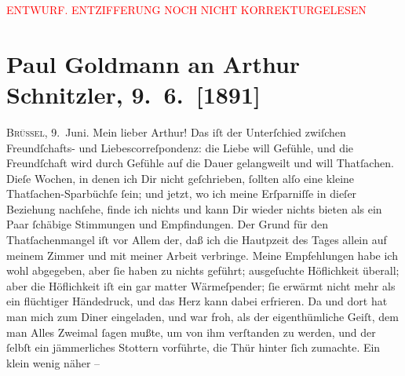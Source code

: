 
\begin{center}
            \textcolor{red}{ENTWURF. ENTZIFFERUNG NOCH NICHT KORREKTURGELESEN}
                      \end{center}
            
               \section[Paul Goldmann an Arthur Schnitzler, 9. 6. {[}1891{]}]{ Paul Goldmann an Arthur Schnitzler, 9. 6. {[}1891{]}}\nopagebreak{}\rehead{ }\begin{ledgroupsized}[t]{13cm}\normalsize\beginnumbering{} \toendnotes[C]{\smallbreak\pagebreak[2]} 
\toendnotes[C]{\smallbreak}\pstart
           \raggedleft{}{\pb}\textsc{Brüssel}, 9. Juni.\pend
           \pstart\center{}Mein lieber Arthur!\pend\pstart
           Das iſt der Unterſchied zwiſchen Freundſchafts- und Liebescorreſpondenz: die Liebe
               will Gefühle, und die Freundſchaft wird durch Gefühle auf die Dauer gelangweilt und
               will Thatſachen. Dieſe Wochen, in denen ich Dir nicht geſchrieben, ſollten alſo eine
               kleine Thatſachen-Sparbüchſe ſein; und jetzt, wo ich meine Erſparniſſe in dieſer
               Beziehung nachſehe, finde ich nichts und kann Dir wieder nichts bieten als ein Paar
               ſchäbige Stimmungen und Empfindungen. Der Grund für den Thatſachenmangel iſt vor
               Allem der, daß ich die Hautpzeit des Tages allein auf meinem Zimmer und mit meiner
               Arbeit verbringe. Meine Empfehlungen habe ich wohl abgegeben, aber ſie haben zu
               nichts geführt; ausgeſuchte Höflichkeit überall; aber die Höflichkeit iſt ein gar
               matter Wärmeſpender; ſie erwärmt nicht mehr als ein flüchtiger Händedruck, und das
               Herz kann dabei erfrieren. Da und dort hat man mich zum Diner eingeladen, und war
               froh, als der eigenthümliche Geiſt, dem man Alles Zweimal ſagen mußte, um von ihm
               verſtanden zu werden, und der ſelbſt ein jämmerliches Stottern vorführte, die {\pb}Thür hinter ſich zumachte. Ein klein wenig näher –

\end{ledgroupsized}
